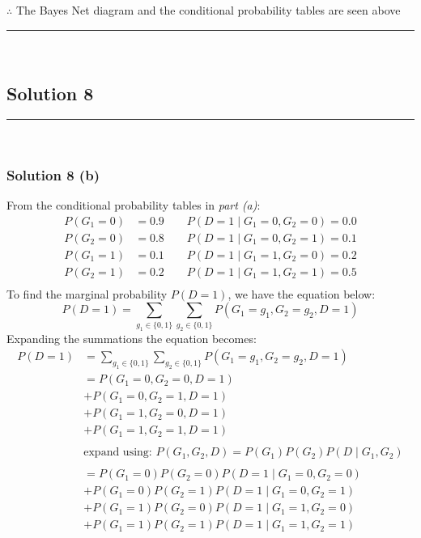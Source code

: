 \documentclass{article}
\begin{document}
\subsubsection*{\normalfont}{$\therefore$ The Bayes Net diagram and the conditional probability tables are seen above}

\noindent\rule{\textwidth}{0.4pt}\\

\newpage

\subsection*{Solution 8}
\noindent\rule{\textwidth}{0.4pt}\\
\subsubsection*{Solution 8 (b)}
From the conditional probability tables  in \textit{part (a)}:
\begin{align*}
    P(G_1=0) &= 0.9 \qquad P(D=1 \mid G_1=0, G_2=0) = 0.0 \\
    P(G_2=0) &= 0.8 \qquad P(D=1 \mid G_1=0, G_2=1) = 0.1 \\
    P(G_1=1) &= 0.1 \qquad P(D=1 \mid G_1=1, G_2=0) = 0.2 \\
    P(G_2=1) &= 0.2 \qquad P(D=1 \mid G_1=1, G_2=1) = 0.5 \\
\end{align*}
To find the marginal probability $P(D=1)$, we have the equation below:
$$ P(D=1) = \sum_{g_1 \in \{0,1\}} \sum_{g_2 \in \{0,1\}} P(G_1=g_1, G_2=g_2, D=1) $$
Expanding the summations the equation becomes:
\begin{align*}
    P(D=1) &= \sum_{g_1 \in \{0,1\}} \sum_{g_2 \in \{0,1\}} P(G_1=g_1, G_2=g_2, D=1) \\
    &=  P(G_1=0, G_2=0, D=1) \\
    &+ P(G_1=0, G_2=1, D=1) \\
    &+ P(G_1=1, G_2=0, D=1) \\
    &+ P(G_1=1, G_2=1, D=1) \\ \\
    &\text{expand using: }P(G_1, G_2, D) = P(G_1)P(G_2)P(D \mid G_1, G_2) \\ \\
    &= P(G_1=0)P(G_2=0)P(D=1 \mid G_1=0, G_2=0) \\
           &+ P(G_1=0)P(G_2=1)P(D=1 \mid G_1=0, G_2=1) \\
           &+ P(G_1=1)P(G_2=0)P(D=1 \mid G_1=1, G_2=0) \\
           &+ P(G_1=1)P(G_2=1)P(D=1 \mid G_1=1, G_2=1)
\end{align*}
\end{document}
